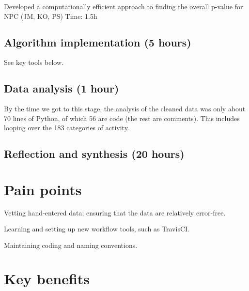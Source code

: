 \documentclass[]{article}
\begin{document}
Developed a computationally efficient approach to finding the
overall p-value for NPC (JM, KO, PS) Time:
1.5h

  
\subsection{Algorithm implementation (5 hours)}

See key tools below.
  
\subsection{Data analysis (1 hour)}

By the time we got to this stage, the analysis of the cleaned data
was only about 70 lines of Python, of which 56 are code (the rest
are comments). This includes looping over the 183 categories of
activity.

\subsection{Reflection and synthesis (20 hours)}


\section{Pain points}\label{pain-points}


Vetting hand-entered data; ensuring that the data are relatively
error-free.

Learning and setting up new workflow tools, such as TravisCI.

Maintaining coding and naming conventions.

\section{Key benefits}\label{key-benefits}

\end{document}
